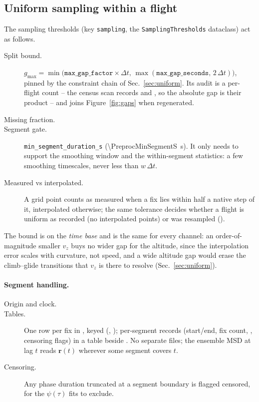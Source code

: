 \subsection{Uniform sampling within a flight}
\label{impl:uniform}
The sampling thresholds (key \texttt{sampling}, the \texttt{SamplingThresholds}
dataclass) act as follows.
\begin{description}
  \item[Split bound.] $g_{\max}=\min\big(\texttt{max\_gap\_factor}\times\Delta t,\,
        \max(\texttt{max\_gap\_seconds},\,2\,\Delta t)\big)$, pinned by the constraint
        chain of Sec.~\ref{sec:uniform}. Its audit is a per-flight count -- the census
        scan records  and , so the absolute gap is their
        product -- and joins Figure~\ref{fig:gaps} when regenerated.
  \item[Missing fraction.] 
  \item[Segment gate.] \texttt{min\_segment\_duration\_s} (\SI{\PreprocMinSegmentS}{\second}). It only
        needs to support the smoothing window and the within-segment statistics: a few
        smoothing timescales, never less than $w\,\Delta t$.
  \item[Measured vs interpolated.] A grid point counts as measured when a fix lies
        within half a native step of it, interpolated otherwise; the same tolerance
        decides whether a flight is uniform as recorded (no interpolated points) or was
        resampled ().
\end{description} The bound is on the \emph{time base} and is the same for
every channel: an order-of-magnitude smaller $v_z$ buys no wider gap for the altitude, since
the interpolation error scales with curvature, not speed, and a wide altitude gap would erase
the climb--glide transitions that $v_z$ is there to resolve (Sec.~\ref{sec:uniform}).

\paragraph{Segment handling.}
\begin{description}
  \item[Origin and clock.] 
  \item[Tables.] One row per fix in , keyed
        (, ); per-segment records (start/end, fix
        count, , censoring flags) in a  table
        beside . No separate files; the ensemble MSD at lag $t$ reads
        $\mathbf{r}(t)$ wherever some segment covers $t$.
  \item[Censoring.] Any phase duration truncated at a segment boundary is flagged
        censored, for the $\psi(\tau)$ fits to exclude.
\end{description}

